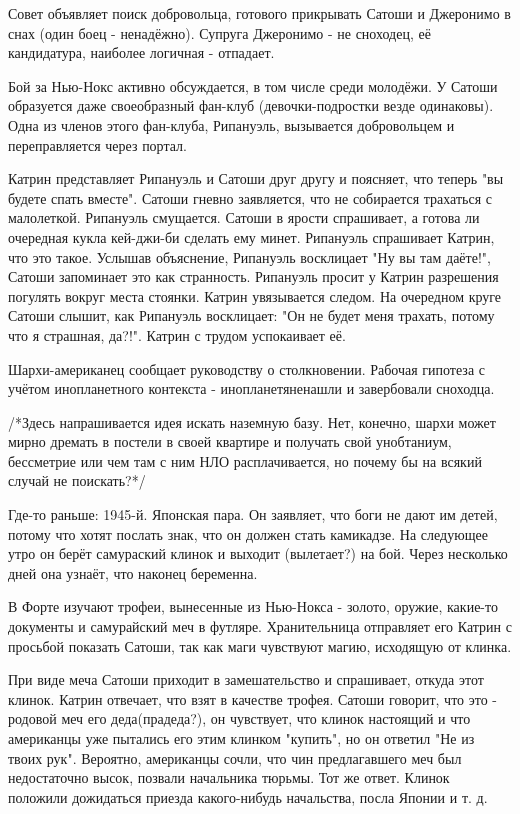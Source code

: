 {{Совет объявляет поиск добровольца, готового прикрывать Сатоши и Джеронимо в снах (один боец - ненадёжно).
Супруга Джеронимо - не сноходец, её кандидатура, наиболее логичная - отпадает.


Бой за Нью-Нокс активно обсуждается, в том числе среди молодёжи. У Сатоши образуется даже своеобразный фан-клуб (девочки-подростки везде одинаковы). Одна из членов этого фан-клуба, Рипануэль, вызывается добровольцем и переправляется через портал.

Катрин представляет Рипануэль и Сатоши друг другу и поясняет, что теперь "вы будете спать вместе". Сатоши гневно заявляется, что не собирается трахаться с малолеткой. Рипануэль смущается. Сатоши в ярости спрашивает, а готова ли очередная кукла кей-джи-би сделать ему минет. Рипануэль спрашивает Катрин, что это такое. Услышав объяснение, Рипануэль восклицает "Ну вы там даёте!", Сатоши запоминает это как странность.
Рипануэль просит у Катрин разрешения погулять вокруг места стоянки. Катрин увязывается следом. На очередном круге Сатоши слышит, как Рипануэль восклицает: "Он не будет меня трахать, потому что я страшная, да?!". Катрин с трудом успокаивает её.



Шархи-американец сообщает руководству о столкновении. Рабочая гипотеза с учётом инопланетного контекста - инопланетяненашли и завербовали сноходца.


/*Здесь напрашивается идея искать наземную базу. Нет, конечно, шархи может мирно дремать в постели в своей квартире и получать свой унобтаниум, бессметрие или чем там с ним НЛО расплачивается, но почему бы на всякий случай не поискать?*/


Где-то раньше: 1945-й. Японская пара. Он заявляет, что боги не дают им детей, потому что хотят послать знак, что он должен стать камикадзе. На следующее утро он берёт самураский клинок и выходит (вылетает?) на бой.
Через несколько дней она узнаёт, что наконец беременна.



В Форте изучают трофеи, вынесенные из Нью-Нокса - золото, оружие, какие-то документы и самурайский меч в футляре. Хранительница отправляет его Катрин с просьбой показать Сатоши, так как маги чувствуют магию, исходящую от клинка.


При виде меча Сатоши приходит в замешательство и спрашивает, откуда этот клинок. Катрин отвечает, что взят в качестве трофея.
Сатоши говорит, что это - родовой меч его деда(прадеда?), он чувствует, что клинок настоящий и что американцы уже пытались его этим клинком "купить", но он ответил "Не из твоих рук". Вероятно, американцы сочли, что чин предлагавшего меч был недостаточно высок, позвали начальника тюрьмы. Тот же ответ. Клинок положили дожидаться приезда какого-нибудь начальства, посла Японии и т. д.

}}

